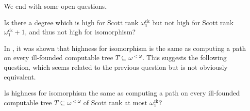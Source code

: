 \documentclass[10pt,a4paper]{amsart}
\newcommand\+[1]{\mathcal{#1}}
\renewcommand\*[1]{\mathbf{#1}}
\renewcommand\=[1]{\text{#1}}
\renewcommand\*[1]{\mathbf{#1}}
\newcommand{\ock}{\omega_{1}^{\mathrm{ck}}}
\begin{document}
We end with some open questions.

\begin{question}
Is there a degree which is high for Scott rank $\ock$ but not high for Scott rank $\ock+1$, and thus not high for isomorphism?
\end{question}

In \cite{cft23}, it was shown that highness for isomorphism is the same as computing a path on every ill-founded computable tree $T \subseteq \omega^{<\omega}$.  This suggests the following question, which seems related to the previous question but is not obviously equivalent.

\begin{question}
Is highness for isomorphism the same as computing a path on every ill-founded computable tree $T \subseteq \omega^{<\omega}$ of Scott rank at most $\ock$?
\end{question}


\printbibliography
\end{document}
